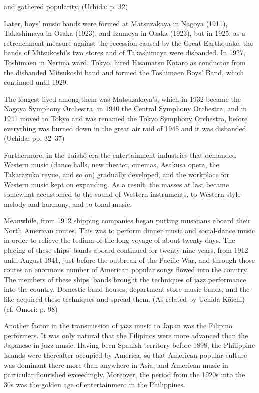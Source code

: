 \begin{gquote}
and gathered popularity. (Uchida: p. 32)
\end{gquote}

Later, boys' music bands were formed at Matsuzakaya in Nagoya (1911), Takashimaya in Osaka (1923), and Izumoya in Osaka (1923), but in 1925, as a retrenchment measure against the recession caused by the Great Earthquake, the bands of Mitsukoshi's two stores and of Takashimaya were disbanded. In 1927, Toshimaen in Nerima ward, Tokyo, hired Hisamatsu Kōtarō as conductor from the disbanded Mitsukoshi band and formed the Toshimaen Boys' Band, which continued until 1929.

The longest-lived among them was Matsuzakaya's, which in 1932 became the Nagoya Symphony Orchestra, in 1940 the Central Symphony Orchestra, and in 1941 moved to Tokyo and was renamed the Tokyo Symphony Orchestra, before everything was burned down in the great air raid of 1945 and it was disbanded. (Uchida: pp. 32–37)

Furthermore, in the Taishō era the entertainment industries that demanded Western music (dance halls, new theater, cinemas, Asakusa opera, the Takarazuka revue, and so on) gradually developed, and the workplace for Western music kept on expanding. As a result, the masses at last became somewhat accustomed to the sound of Western instruments, to Western-style melody and harmony, and to tonal music.

Meanwhile, from 1912 shipping companies began putting musicians aboard their North American routes. This was to perform dinner music and social-dance music in order to relieve the tedium of the long voyage of about twenty days. The placing of these ships' bands aboard continued for twenty-nine years, from 1912 until August 1941, just before the outbreak of the Pacific War, and through those routes an enormous number of American popular songs flowed into the country. The members of these ships' bands brought the techniques of jazz performance into the country. Domestic band-houses, department-store music bands, and the like acquired these techniques and spread them. (As related by Uchida Kōichi) (cf. Ōmori: p. 98)

Another factor in the transmission of jazz music to Japan was the Filipino performers. It was only natural that the Filipinos were more advanced than the Japanese in jazz music. Having been Spanish territory before 1898, the Philippine Islands were thereafter occupied by America, so that American popular culture was dominant there more than anywhere in Asia, and American music in particular flourished exceedingly. Moreover, the period from the 1920s into the 30s was the golden age of entertainment in the Philippines.

